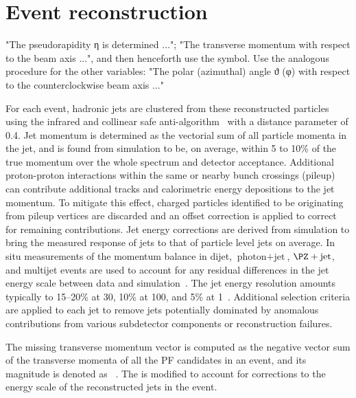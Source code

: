 \section{Event reconstruction}
\label{sec:eventReconstruction}

"The pseudorapidity η is determined ..."; "The transverse momentum \pt with respect to the beam axis ...", and then henceforth use the symbol. Use the analogous procedure for the other variables: "The polar (azimuthal) angle ϑ (φ) with respect to the counterclockwise beam axis ..."





For each event, hadronic jets are clustered from these reconstructed particles using the infrared and collinear safe anti-\kt algorithm~\cite{Cacciari:2008gp, Cacciari:2011ma} with a distance parameter of 0.4. Jet momentum is determined as the vectorial sum of all particle momenta in the jet, and is found from simulation to be, on average, within 5 to 10\% of the true momentum over the whole \pt spectrum and detector acceptance. Additional proton-proton interactions within the same or nearby bunch crossings (pileup) can contribute additional tracks and calorimetric energy depositions to the jet momentum. To mitigate this effect, charged particles identified to be originating from pileup vertices are discarded and an offset correction is applied to correct for remaining contributions. Jet energy corrections are derived from simulation to bring the measured response of jets to that of particle level jets on average. In situ measurements of the momentum balance in dijet, $\text{photon} + \text{jet}$, $\PZ + \text{jet}$, and multijet events are used to account for any residual differences in the jet energy scale between data and simulation~\cite{Khachatryan:2016kdb}. The jet energy resolution amounts typically to 15--20\% at 30\GeV, 10\% at 100\GeV, and 5\% at 1\TeV~\cite{Khachatryan:2016kdb}. Additional selection criteria are applied to each jet to remove jets potentially dominated by anomalous contributions from various subdetector components or reconstruction failures. 

The missing transverse momentum vector \ptvecmiss is computed as the negative vector sum of the transverse momenta of all the PF candidates in an event, and its magnitude is denoted as \ptmiss~\cite{Sirunyan:2019kia}. The \ptvecmiss is modified to account for corrections to the energy scale of the reconstructed jets in the event. 
